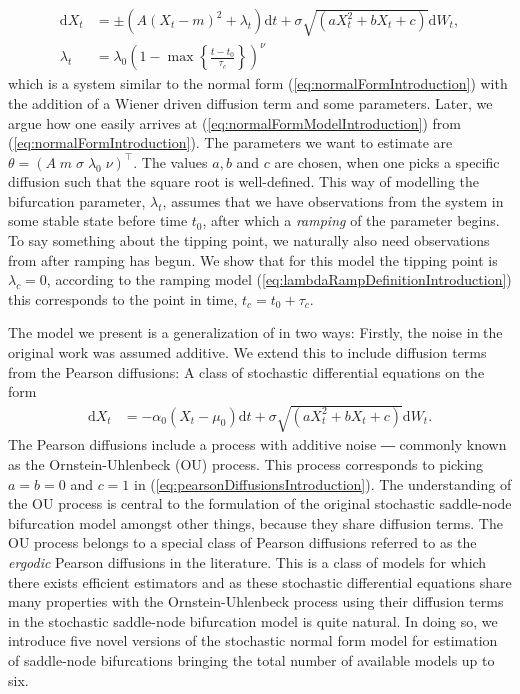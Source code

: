 \begin{align}
    \mathrm{d}X_t &= \pm(A(X_t - m)^2 + \lambda_t)\mathrm{d}t + \sigma\sqrt{\left(aX_t^2 + bX_t + c\right)}\mathrm{d}W_t, \label{eq:normalFormModelIntroduction}\\
    \lambda_t &= \lambda_0\left(1 - \max\left\{\frac{t - t_0}{\tau_c}\right\}\right)^\nu \label{eq:lambdaRampDefinitionIntroduction}
\end{align}
which is a system similar to the normal form (\ref{eq:normalFormIntroduction}) with the addition of a Wiener driven diffusion term and some parameters. Later, we argue how one easily arrives at (\ref{eq:normalFormModelIntroduction}) from (\ref{eq:normalFormIntroduction}). The parameters we want to estimate are $\theta = \left(A\; m\; \sigma\; \lambda_0\; \nu\right)^\top$. The values $a, b$ and $c$ are chosen, when one picks a specific diffusion such that the square root is well-defined. This way of modelling the bifurcation parameter, $\lambda_t$, assumes that we have observations from the system in some stable state before time $t_0$, after which a \textit{ramping} of the parameter begins. To say something about the tipping point, we naturally also need observations from after ramping has begun. We show that for this model the tipping point is $\lambda_c = 0$, according to the ramping model (\ref{eq:lambdaRampDefinitionIntroduction}) this corresponds to the point in time, $t_c = t_0 + \tau_c$.

The model we present is a generalization of \cite[equation (1)]{Ditlevsen2023} in two ways: Firstly, the noise in the original work was assumed additive. We extend this to include diffusion terms from the Pearson diffusions: A class of stochastic differential equations on the form
\begin{align}
    \mathrm{d}X_t &= -\alpha_0\left(X_t - \mu_0\right)\mathrm{d}t + \sigma\sqrt{\left(aX_t^2 + bX_t + c\right)}\mathrm{d}W_t. \label{eq:pearsonDiffusionsIntroduction}
\end{align}
The Pearson diffusions include a process with additive noise ― commonly known as the Ornstein-Uhlenbeck (OU) process. This process corresponds to picking $a = b = 0$ and $c = 1$ in (\ref{eq:pearsonDiffusionsIntroduction}). The understanding of the OU process is central to the formulation of the original stochastic saddle-node bifurcation model amongst other things, because they share diffusion terms. The OU process belongs to a special class of Pearson diffusions referred to as the \textit{ergodic} Pearson diffusions in the literature. This is a class of models for which there exists efficient estimators and as these stochastic differential equations share many properties with the Ornstein-Uhlenbeck process using their diffusion terms in the stochastic saddle-node bifurcation model is quite natural. In doing so, we introduce five novel versions of the stochastic normal form model for estimation of saddle-node bifurcations bringing the total number of available models up to six.


